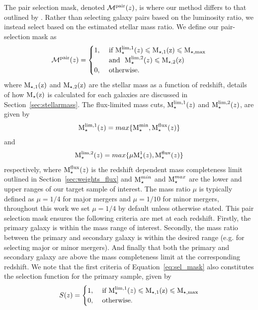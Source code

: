 The pair selection mask, denoted $\mathcal{M}^{\rm{pair}}(z)$, is where our method differs to that outlined by . Rather than selecting galaxy pairs based on the luminosity ratio, we instead select based on the estimated stellar mass ratio. We define our pair-selection mask as
\begin{equation}\label{eq:sel_mask}
\mathcal{M}^{\rm{pair}}(z) = 
\begin{cases}
1, & \text{ if } \text{M}_{\star}^{\rm{lim},1}(z) \leqslant \rm{M}_{\star,1}(z) \leqslant \rm{M}_{\star,max}  \\ 
	& \text{ and }~ \text{M}_{\star}^{\rm{lim},2}(z) \leqslant \rm{M}_{\star,2}(z) \\
0, & \text{ otherwise. } 
\end{cases}
\end{equation}
where $\rm{M}_{\star,1}(z)$ and $\rm{M}_{\star,2}(z)$ are the stellar mass as a function of redshift, details of how $\rm{M}_{\star}(z)$ is calculated for each galaxies are discussed in Section~\ref{sec:stellarmass}. The flux-limited mass cuts, $\text{M}_{\star}^{\rm{lim},1}(z)$ and $\text{M}_{\star}^{\rm{lim},2}(z)$, are given by
\begin{equation}\label{eq:fluxlim_pri}
\text{M}_{\star}^{\rm{lim},1}(z)= max \{ \text{M}_{\star}^{\rm{min}}, \text{M}_{\star}^{\rm{flux}}(z) \}
\end{equation}
and
\begin{equation}\label{eq:fluxlim_sec}
\text{M}_{\star}^{\rm{lim},2}(z) = max \{ \mu \text{M}_{\star}^{1}(z), \text{M}_{\star}^{\rm{flux}}(z) \}
\end{equation}
respectively, where $\text{M}_{\star}^{\rm{flux}}(z)$ is the redshift dependent mass completeness limit outlined in Section~\ref{sec:weights_flux} and $\text{M}_{\star}^{min}$ and $\text{M}_{\star}^{max}$ are the lower and upper ranges of our target sample of interest. The mass ratio $\mu$ is typically defined as $\mu = 1/4$ for major mergers and $\mu = 1/10$ for minor mergers, throughout this work we set $\mu = 1/4$ by default unless otherwise stated. This pair selection mask ensures the following criteria are met at each redshift. Firstly, the primary galaxy is within the mass range of interest. Secondly, the mass ratio between the primary and secondary galaxy is within the desired range (e.g. for selecting major or minor mergers). And finally that both the primary and secondary galaxy are above the mass completeness limit at the corresponding redshift. We note that the first criteria of Equation~\ref{eq:sel_mask} also constitutes the selection function for the primary sample, given by
\begin{equation}\label{eq:pri_sel}
S(z) = 
\begin{cases}
1, & \text{ if } \text{M}_{\star}^{\rm{lim},1}(z) \leqslant \rm{M}_{\star,1}(z) \leqslant \rm{M}_{\star,max}  \\ 
0, & \text{ otherwise. } 
\end{cases}
\end{equation}


